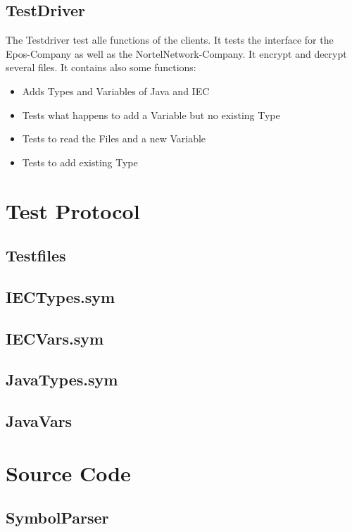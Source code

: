 \subsection{TestDriver}
The Testdriver test alle functions of the clients. It tests the interface for the Epos-Company as well as the NortelNetwork-Company. It encrypt and decrypt several files. It contains also some functions:
\begin{itemize}
	\item Adds Types and Variables of Java and IEC
	\item Tests what happens to add a Variable but no existing Type
	\item Tests to read the Files and a new Variable
	\item Tests to add existing Type 
\end{itemize}

\newpage
\section{Test Protocol}

\subsection{Testfiles}
\subsection{IECTypes.sym}
\subsection{IECVars.sym}

\subsection{JavaTypes.sym}
\subsection{JavaVars}


\newpage
\section{Source Code}

\subsection{SymbolParser}
